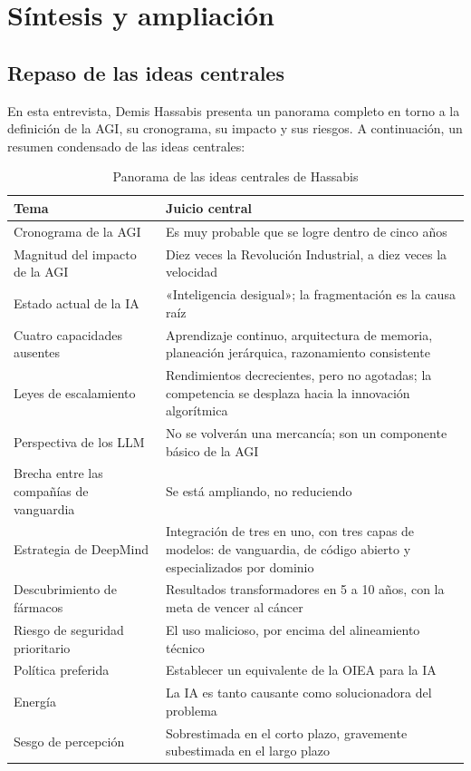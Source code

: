 \section{Síntesis y ampliación}

\subsection{Repaso de las ideas centrales}

En esta entrevista, Demis Hassabis presenta un panorama completo en torno a la definición de la AGI, su cronograma, su impacto y sus riesgos. A continuación, un resumen condensado de las ideas centrales:

\begin{table}[H]
\centering
\begin{tabular}{p{} p{}}
\toprule
\textbf{Tema} & \textbf{Juicio central} \\
\midrule
Cronograma de la AGI & Es muy probable que se logre dentro de cinco años \\
Magnitud del impacto de la AGI & Diez veces la Revolución Industrial, a diez veces la velocidad \\
Estado actual de la IA & «Inteligencia desigual»; la fragmentación es la causa raíz \\
Cuatro capacidades ausentes & Aprendizaje continuo, arquitectura de memoria, planeación jerárquica, razonamiento consistente \\
Leyes de escalamiento & Rendimientos decrecientes, pero no agotadas; la competencia se desplaza hacia la innovación algorítmica \\
Perspectiva de los LLM & No se volverán una mercancía; son un componente básico de la AGI \\
Brecha entre las compañías de vanguardia & Se está ampliando, no reduciendo \\
Estrategia de DeepMind & Integración de tres en uno, con tres capas de modelos: de vanguardia, de código abierto y especializados por dominio \\
Descubrimiento de fármacos & Resultados transformadores en 5 a 10 años, con la meta de vencer al cáncer \\
Riesgo de seguridad prioritario & El uso malicioso, por encima del alineamiento técnico \\
Política preferida & Establecer un equivalente de la OIEA para la IA \\
Energía & La IA es tanto causante como solucionadora del problema \\
Sesgo de percepción & Sobrestimada en el corto plazo, gravemente subestimada en el largo plazo \\
\bottomrule
\end{tabular}
\caption{Panorama de las ideas centrales de Hassabis}
\end{table}


